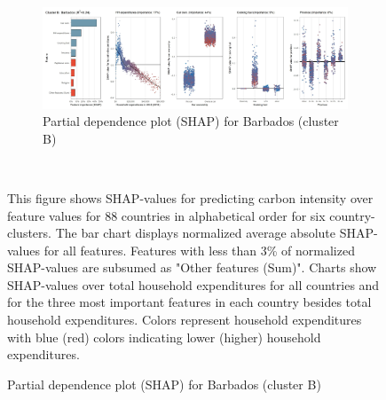 \begin{figure}[ht!]
    \vspace{0.5cm}
   \begin{subfigure}[b]{\textwidth}
         \centering
         \caption{Partial dependence plot (SHAP) for Barbados (cluster B)}
         \label{fig:5b_BRB}
         \includegraphics[width=\textwidth]{Figure 5b/Figure_5b_BRB}
         \end{subfigure}
    \\
    \vspace{0.5cm}
   
    \begin{subcaption2}
     This figure shows SHAP-values for predicting carbon intensity over feature values for 88 countries in alphabetical order for six country-clusters. The bar chart displays normalized average absolute SHAP-values for all features. Features with less than 3\% of normalized SHAP-values are subsumed as "Other features (Sum)". Charts show SHAP-values over total household expenditures for all countries and for the three most important features in each country besides total household expenditures. Colors represent household expenditures with blue (red) colors indicating lower (higher) household expenditures.
     \end{subcaption2}
\end{figure}

